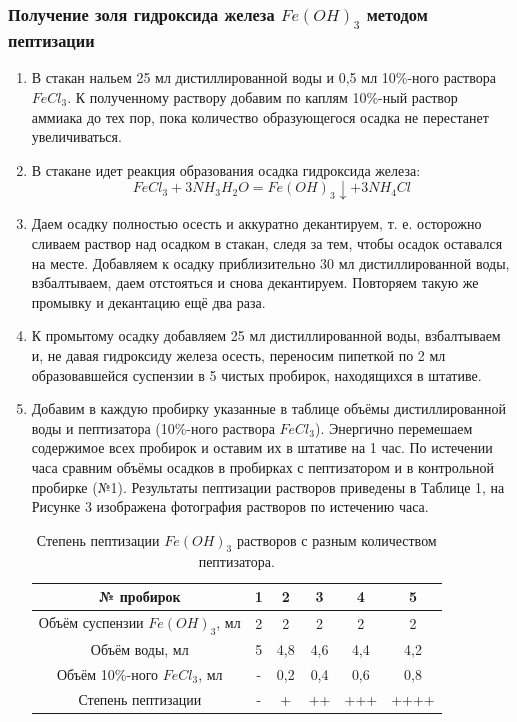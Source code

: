 \documentclass[a4paper,12pt]{article}
\begin{document}
\subsubsection{Получение золя гидроксида железа $Fe(OH)_3$ методом пептизации}
\begin{enumerate}
    \item В стакан нальем 25 мл дистиллированной воды и 0,5 мл 10\%-ного раствора $FeCl_3$. К полученному раствору добавим по каплям 10\%-ный раствор аммиака до тех пор, пока количество образующегося осадка не перестанет увеличиваться. 
    \item В стакане идет реакция образования осадка гидроксида железа:
    \[FeCl_3+3NH_3H_2O=Fe(OH)_3\downarrow+3NH_4Cl\]
    \item Даем осадку полностью осесть и аккуратно декантируем, т. е. осторожно сливаем раствор над осадком в стакан, следя за тем, чтобы осадок оставался на месте. Добавляем к осадку приблизительно 30 мл дистиллированной воды, взбалтываем, даем отстояться и снова декантируем. Повторяем такую же промывку и декантацию ещё два раза. 
    \item К промытому осадку добавляем 25 мл дистиллированной воды, взбалтываем и, не давая гидроксиду железа осесть, переносим пипеткой по 2 мл образовавшейся суспензии в 5 чистых пробирок, находящихся в штативе.
\item Добавим в каждую пробирку указанные в таблице объёмы дистиллированной воды и пептизатора (10\%-ного раствора $FeCl_3$). Энергично перемешаем содержимое всех пробирок и оставим их в штативе на 1 час. По истечении часа сравним объёмы осадков в пробирках с пептизатором и в контрольной пробирке (№1). Результаты пептизации растворов приведены в Таблице 1, на Рисунке 3 изображена фотография растворов по истечению часа.

\begin{table}[h!]
\centering
\caption{Степень пептизации $Fe(OH)_3$ растворов с разным количеством пептизатора.}
\begin{tabular}{|c|c|c|c|c|c|}
\hline
№ пробирок           & 1 & 2   & 3   & 4   & 5    \\ \hline
Объём суспензии $Fe(OH)_3$, мл & 2 & 2   & 2   & 2   & 2    \\ \hline
Объём воды, мл       & 5 & 4,8 & 4,6 & 4,4 & 4,2  \\ \hline
Объём 10\%-ного $FeCl_3$, мл & - & 0,2 & 0,4 & 0,6 & 0,8  \\ \hline
Степень пептизации   & - & +   & ++  & +++ & ++++ \\ \hline
\end{tabular}
\end{table}



\end{enumerate}
\end{document}
